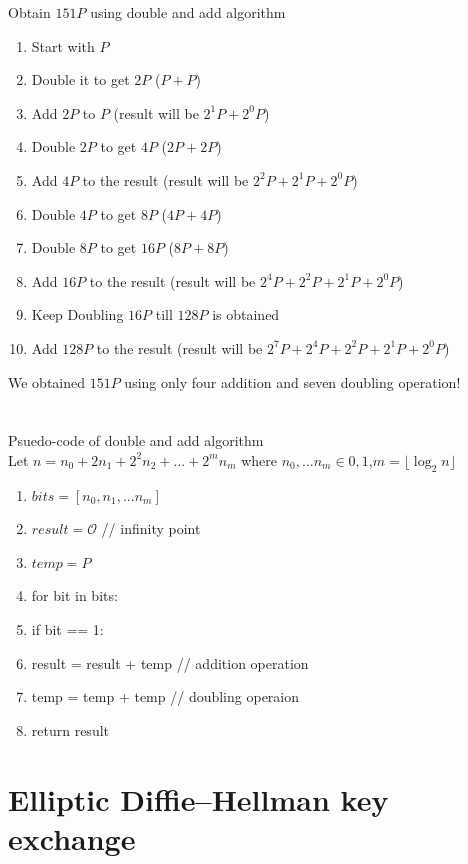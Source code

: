 \documentclass[12pt,a4paper]{report}
\begin{document}
Obtain $151P$ using double and add algorithm
\begin{enumerate}
\item Start with $P$
\item Double it to get $2P$ ($P+P$)
\item Add $2P$ to $P$ (result will be $2^1P+2^0P$)
\item Double $2P$ to get $4P$ ($2P+2P$)
\item Add $4P$ to the result (result will be $2^2P+2^1P+2^0P$)
\item Double $4P$ to get $8P$ ($4P+4P$)
\item Double $8P$ to get $16P$ ($8P+8P$)
\item Add $16P$ to the result (result will be $2^4P+2^2P+2^1P+2^0P$)
\item Keep Doubling $16P$ till $128P$ is obtained
\item Add $128P$ to the result (result will be $2^7P+2^4P+2^2P+2^1P+2^0P$)
\end{enumerate}
We obtained $151P$ using only four addition and seven doubling operation!\\\\\\
Psuedo-code of double and add algorithm\\
Let $n=n_0+2n_1+2^2n_2+...+2^mn_m$ where $n_0,...n_m \in {0,1}$,$m =\lfloor \log_2 {n} \rfloor$ 
\begin{enumerate}
\item $bits = [n_0,n_1,...n_m]$
\item $result=\mathscr{O}$ \hspace{10mm} //  infinity point
\item $temp=P$
\item for bit in bits:
\item \hspace{10mm}  if bit == 1:
\item \hspace{10mm} \hspace{10mm}  result = result + temp \hspace{10mm} // addition operation
\item \hspace{10mm} temp = temp + temp \hspace{10mm}  // doubling operaion
\item return result 
\end{enumerate}





\cleardoublepage
\section{Elliptic Diﬃe–Hellman key exchange}



\end{document}
